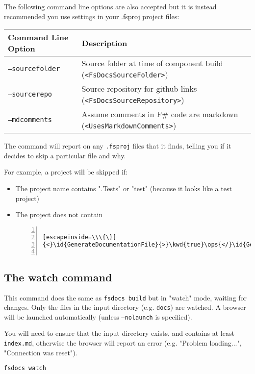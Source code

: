 \documentclass{article}
\newcommand{\id}[1]{\textcolor{black}{#1}}
\newcommand{\kwd}[1]{\textcolor{navy}{#1}}
\newcommand{\ops}[1]{\textcolor{purple}{#1}}
\begin{document}
The following command line options are also accepted but it is instead recommended you use
settings in your .fsproj project files:
\begin{tabular}{|l|l|}\hline
\textbf{Command Line Option} & \textbf{Description}\\ \hline\hline
\texttt{--sourcefolder} & Source folder at time of component build (\texttt{<FsDocsSourceFolder>})\\ \hline
\texttt{--sourcerepo} & Source repository for github links (\texttt{<FsDocsSourceRepository>})\\ \hline
\texttt{--mdcomments} & Assume comments in F\# code are markdown (\texttt{<UsesMarkdownComments>})\\ \hline
\end{tabular}



The command will report on any \texttt{.fsproj} files that it finds, telling you if it decides to skip a particular file and why.


For example, a project will be skipped if:
\begin{itemize}
\item 

The project name contains ".Tests" or "test" (because it looks like a test project)

\item 

The project does not contain
\begin{lstlisting}[numbers=left]

[escapeinside=\\\{\}]
{<}\id{GenerateDocumentationFile}{>}\kwd{true}\ops{</}\id{GenerateDocumentationFile}{>}


\end{lstlisting}


\end{itemize}

\subsection*{The watch command}



This command does the same as \texttt{fsdocs build} but in "watch" mode, waiting for changes. Only the files in the input
directory (e.g. \texttt{docs}) are watched. A browser will be launched automatically (unless \texttt{--nolaunch} is specified).


You will need to ensure that the input directory exists, and contains at least \texttt{index.md}, otherwise the browser will
report an error (e.g. "Problem loading...", "Connection was reset").
\begin{lstlisting}
fsdocs watch

\end{lstlisting}
\end{document}
